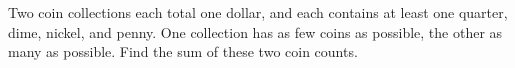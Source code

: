 Two coin collections each total one dollar, and each contains at least one quarter, dime, nickel, and penny. One collection has as few coins as possible, the other as many as possible. Find the sum of these two coin counts.

